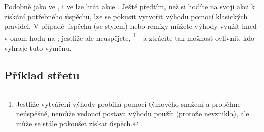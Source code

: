 \documentclass[../main.tex]{subfiles}
\begin{document}
Podobně jako ve , i ve  lze hrát akce . Ještě předtím, než si hodíte na svoji akci  k získání potřebného úspěchu, lze se pokusit vytvořit výhodu pomocí klasických pravidel. V případě úspěchu (se stylem) nebo remízy můžete výhody využít hned v onom hodu na ; jestliže ale neuspějete,  \footnote{Jestliže vytváření výhody probíhá pomocí týmového snažení a proběhne neúspěšně, nemůže vedoucí postava výhodu použít (protože nevznikla), ale může se stále pokoušet získat úspěch.} - a ztrácíte tak možnost ovlivnit, kdo vyhraje tuto výměnu.

\subsection{Příklad střetu}
\label{sec:příklad-střet}
\end{document}
